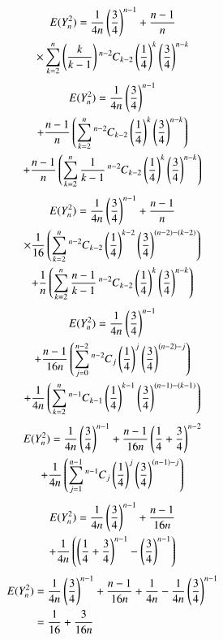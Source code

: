 \documentclass[journal,12pt,twocolumn]{IEEEtran}
\begin{document}
\begin{multline}
    E(Y_n^2) =  \frac{1}{4n}\brak{\frac{3}{4}}^{n-1} + \frac{n-1}{n} 
   \\\times\sum_{k=2}^{n} \brak{\frac{k}{k-1}}\comb[n-2]{k-2}\brak{\frac{1}{4}}^{k} \brak{\frac{3}{4}}^{n-k}
\end{multline}
\begin{multline}
    E(Y_n^2)  = \frac{1}{4n}\brak{\frac{3}{4}}^{n-1} \\+ \frac{n-1}{n} 
   \brak{\sum_{k=2}^{n}\comb[n-2]{k-2}\brak{\frac{1}{4}}^{k} \brak{\frac{3}{4}}^{n-k} }
   \\+\frac{n-1}{n} \brak{\sum_{k=2}^{n}\frac{1}{k-1}\comb[n-2]{k-2}\brak{\frac{1}{4}}^{k} \brak{\frac{3}{4}}^{n-k} } 
\end{multline}
\begin{multline}
    E(Y_n^2)  = \frac{1}{4n}\brak{\frac{3}{4}}^{n-1} + \frac{n-1}{n}\\ \times\frac{1}{16} 
   \brak{\sum_{k=2}^{n}\comb[n-2]{k-2}\brak{\frac{1}{4}}^{k-2} \brak{\frac{3}{4}}^{(n-2)-(k-2)} }
   \\+\frac{1}{n} \brak{\sum_{k=2}^{n}\frac{n-1}{k-1}\comb[n-2]{k-2}\brak{\frac{1}{4}}^{k} \brak{\frac{3}{4}}^{n-k} }
\end{multline}
\begin{multline}
     E(Y_n^2)= \frac{1}{4n}\brak{\frac{3}{4}}^{n-1} \\+ \frac{n-1}{16n} 
   \brak{\sum_{j=0}^{n-2}\comb[n-2]{j}\brak{\frac{1}{4}}^{j} \brak{\frac{3}{4}}^{(n-2)-j} }
   \\+\frac{1}{4n} \brak{\sum_{k=2}^{n}\comb[n-1]{k-1}\brak{\frac{1}{4}}^{k-1} \brak{\frac{3}{4}}^{(n-1)-(k-1)} } 
\end{multline}
\begin{multline}
    E(Y_n^2) = \frac{1}{4n}\brak{\frac{3}{4}}^{n-1} + \frac{n-1}{16n}\brak{\frac{1}{4} + \frac{3}{4}}^{n-2}
   \\+\frac{1}{4n} \brak{\sum_{j=1}^{n-1}\comb[n-1]{j}\brak{\frac{1}{4}}^{j} \brak{\frac{3}{4}}^{(n-1)-j} }
\end{multline}
\begin{multline}
   E(Y_n^2) = \frac{1}{4n}\brak{\frac{3}{4}}^{n-1} + \frac{n-1}{16n}
   \\+\frac{1}{4n} \brak{\brak{\frac{1}{4} + \frac{3}{4}}^{n-1} - \brak{\frac{3}{4}}^{n-1}} 
\end{multline}
\begin{align}
    E(Y_n^2) &= \frac{1}{4n}\brak{\frac{3}{4}}^{n-1} + \frac{n-1}{16n} +\frac{1}{4n} - \frac{1}{4n}\brak{\frac{3}{4}}^{n-1}
    \\&= \frac{1}{16} + \frac{3}{16n} \label{equation 2}
\end{align}
\end{document}
